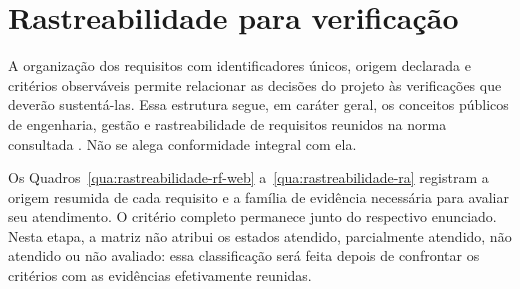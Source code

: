 \section{Rastreabilidade para verificação}

A organização dos requisitos com identificadores únicos, origem declarada e critérios observáveis permite relacionar as decisões do projeto às verificações que deverão sustentá-las. Essa estrutura segue, em caráter geral, os conceitos públicos de engenharia, gestão e rastreabilidade de requisitos reunidos na norma consultada \cite{iso29148:2018}. Não se alega conformidade integral com ela.

Os Quadros~\ref{qua:rastreabilidade-rf-web} a~\ref{qua:rastreabilidade-ra} registram a origem resumida de cada requisito e a família de evidência necessária para avaliar seu atendimento. O critério completo permanece junto do respectivo enunciado. Nesta etapa, a matriz não atribui os estados atendido, parcialmente atendido, não atendido ou não avaliado: essa classificação será feita depois de confrontar os critérios com as evidências efetivamente reunidas.

